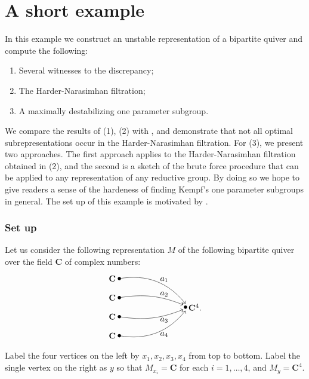\documentclass[a4paper]{amsart}
\numberwithin{equation}{section}
\theoremstyle{plain}
\theoremstyle{definition}
\begin{document}
\section{A short example}\label{a_short_example}
In this example we construct an unstable representation of a bipartite quiver and compute the following:
\begin{enumerate}
\item Several witnesses to the discrepancy;
\item The Harder-Narasimhan filtration;
\item A maximally destabilizing one parameter subgroup.
\end{enumerate}
We compare the results of (1), (2) with , and demonstrate that not all optimal subrepresentations occur in the Harder-Narasimhan filtration. For (3), we present two approaches. The first approach applies  to the Harder-Narasimhan filtration obtained in (2), and the second is a sketch of the brute force procedure that can be applied to any representation of any reductive group. By doing so we hope to give readers a sense of the hardeness of finding Kempf's one parameter subgroups in general. The set up of this example is motivated by \cite{MR4238986}. 
\subsubsection{Set up}
Let us consider the following representation $M$ of the following bipartite quiver over the field $\mathbf{C}$ of complex numbers:
$$\begin{tikzpicture}
\node at (-0.3,0.8) {$\mathbf{C}$};
\node at (-0.3,0) {$\mathbf{C}$};
\node at (-0.3,-0.8) {$\mathbf{C}$};
\node at (-0.3,-1.6) {$\mathbf{C}$};
\node at (3.2,-0.4) {$\mathbf{C}^4$.};
\fill (0,0.8) circle (2pt);
\fill (2.8,-0.4) circle (2pt);
\fill (0,0) circle (2pt);
\fill (0,-0.8) circle (2pt);
\fill (0,-1.6) circle (2pt);
\draw [->] (0,0.8) to [bend left] (2.8,-0.25);
\draw [->] (0,0) to [bend left=15] (2.7,-0.3);
\draw [->] (0,-0.8) to [bend right = 15] (2.7,-0.5);
\draw [->] (0,-1.6) to [bend right] (2.8,-0.55);
\node at (1.9,0.75) {$a_1$};
\node at (1.9,0.15) {$a_2$};
\node at (1.9,-0.95) {$a_3$};
\node at (1.9,-1.55) {$a_4$};
\end{tikzpicture}$$
Label the four vertices on the left by $x_1,x_2,x_3,x_4$ from top to bottom. Label the single vertex on the right as $y$ so that $M_{x_i}=\mathbf{C}$ for each $i=1,\ldots ,4$, and $M_{y}=\mathbf{C}^4$. 
\end{document}
